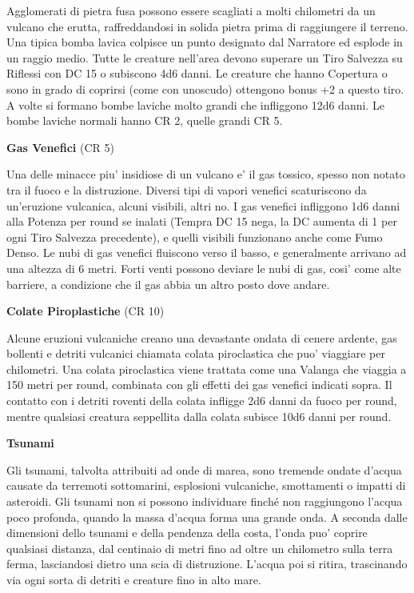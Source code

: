 \documentclass[a4paper,11pt,twoside,openany]{dndbook}
\begin{document}
{Agglomerati di pietra fusa possono essere scagliati a molti chilometri da un vulcano che erutta, raffreddandosi in solida pietra prima di raggiungere il terreno. Una tipica bomba lavica colpisce un punto designato dal Narratore ed esplode in un raggio medio. Tutte le creature nell'area devono superare un Tiro Salvezza su Riflessi con DC 15 o subiscono 4d6 danni. Le creature che hanno Copertura o sono in grado di coprirsi (come con uno­scudo) ottengono bonus +2 a questo tiro. A volte si formano bombe laviche molto grandi che infliggono 12d6 danni. Le bombe laviche normali hanno CR 2, quelle grandi CR 5.

\textbf{Gas Venefici} (CR 5)

Una delle minacce piu' insidiose di un vulcano e' il gas tossico, spesso non notato tra il fuoco e la distruzione. Diversi tipi di vapori venefici scaturiscono da un'eruzione vulcanica, alcuni visibili, altri no. I gas venefici infliggono 1d6 danni alla Potenza per round se inalati (Tempra DC 15 nega, la DC aumenta di 1 per ogni Tiro Salvezza precedente), e quelli visibili funzionano anche come Fumo Denso. Le nubi di gas venefici fluiscono verso il basso, e generalmente arrivano ad una altezza di 6 metri. Forti venti possono deviare le nubi di gas, cosi' come alte barriere, a condizione che il gas abbia un altro posto dove andare.

\textbf{Colate Piroplastiche} (CR 10)

Alcune eruzioni vulcaniche creano una devastante ondata di cenere ardente, gas bollenti e detriti vulcanici chiamata colata piroclastica che puo' viaggiare per chilometri. Una colata piroclastica viene trattata come una Valanga che viaggia a 150 metri per round, combinata con gli effetti dei gas venefici indicati sopra. Il contatto con i detriti roventi della colata infligge 2d6 danni da fuoco per round, mentre qualsiasi creatura seppellita dalla colata subisce 10d6 danni per round.

\textbf{Tsunami}

Gli tsunami, talvolta attribuiti ad onde di marea, sono tremende ondate d'acqua causate da terremoti sottomarini, esplosioni vulcaniche, smottamenti o impatti di asteroidi. Gli tsunami non si possono individuare finché non raggiungono l'acqua poco profonda, quando la massa d'acqua forma una grande onda. A seconda dalle dimensioni dello tsunami e del­la pendenza della costa, l'onda puo' coprire qualsiasi distanza, dal centinaio di metri fino ad oltre un chilometro sulla terra ferma, lasciandosi dietro una scia di distruzione. L'acqua poi si ritira, trascinando via ogni sorta di detriti e creature fino in alto mare.

}
\end{document}
